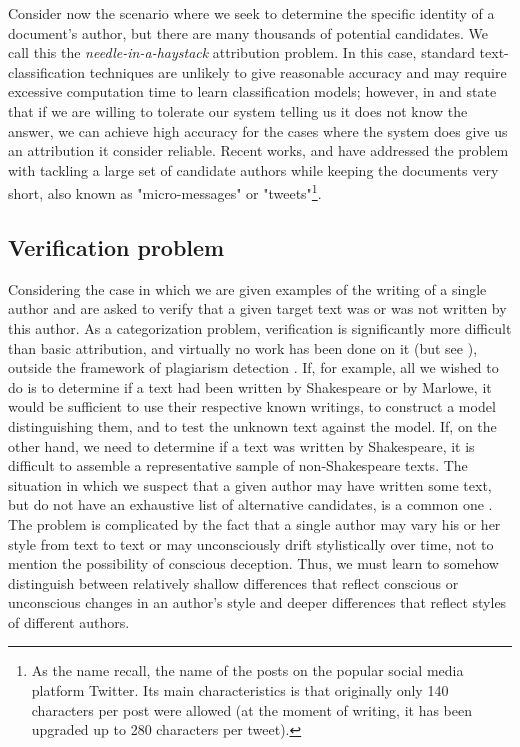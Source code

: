 Consider now the scenario where we seek to determine the specific identity of a document’s author, but there are many thousands of potential candidates. We call this the \textit{needle-in-a-haystack} attribution problem. In this case, standard text-classification techniques are unlikely to give reasonable accuracy and may require excessive computation time to learn classification models; however, in \cite{koppel2009computational} and \cite{koppel2011authorship} state that if we are willing to tolerate our system telling us it does not know the answer, we can achieve high accuracy for the cases where the system does give us an attribution it consider reliable.
Recent works, \cite{schwartz2013authorship} and \cite{theophilo2019needle} have addressed the problem with tackling a large set of candidate authors while keeping the documents very short, also known as "micro-messages" or "tweets"\footnote{As the name recall, the name of the posts on the popular social media platform Twitter. Its main characteristics is that originally only 140 characters per post were allowed (at the moment of writing, it has been upgraded up to 280 characters per tweet).}.

\subsection{Verification problem}
 
Considering the case in which we are given examples of the writing of a single author and are asked to verify that a given target text was or was not written by this author. As a categorization problem, verification is significantly more difficult than basic attribution, and virtually no work has been done on it (but see \citeauthor{halteren2004linguistic} \citeyear{halteren2004linguistic}), outside the framework of plagiarism detection \citeauthor{zu2007plagiarism} \citeyear{zu2007plagiarism}. If, for example, all we wished to do is to determine if a text had been written by Shakespeare or by Marlowe, it would be sufficient to use their respective known writings, to construct a model distinguishing them, and to test the unknown text against the model. If, on the other hand, we need
to determine if a text was written by Shakespeare, it is difficult to assemble a representative sample of non-Shakespeare texts.
The situation in which we suspect that a given author may have written some text, but do not have an exhaustive list of alternative candidates, is a common one \cite{koppel2009computational}. The problem is complicated by the fact that a single author may vary his or her style from text to text or may unconsciously drift stylistically over time, not to mention the possibility of conscious deception. Thus, we must learn to somehow distinguish between relatively shallow differences that reflect conscious or unconscious changes in an author’s style and deeper differences that reflect styles of different authors.


